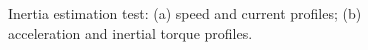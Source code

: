 \documentclass[11pt]{article}
\begin{document}
		\begin{figure}[h!]
		\centering
		\quad
		\caption{Inertia estimation test: (a) speed and current profiles; (b) acceleration and inertial torque profiles.}
		\end{figure}
	
\end{document}
